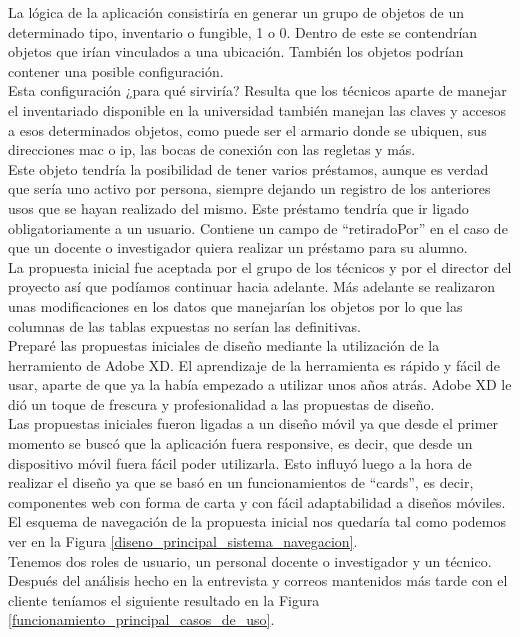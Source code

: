 La lógica de la aplicación consistiría en generar un grupo de objetos de un determinado tipo, inventario o fungible, 1 o 0. Dentro de este se contendrían objetos que irían vinculados a una ubicación. También los objetos podrían contener una posible configuración.
\\Esta configuración ¿para qué sirviría? Resulta que los técnicos aparte de manejar el inventariado disponible en la universidad también manejan las claves y accesos a esos determinados objetos, como puede ser el armario donde se ubiquen, sus direcciones mac o ip, las bocas de conexión con las regletas y más.
\\Este objeto tendría la posibilidad de tener varios préstamos, aunque es verdad que sería uno activo por persona, siempre dejando un registro de los anteriores usos que se hayan realizado del mismo. Este préstamo tendría que ir ligado obligatoriamente a un usuario. Contiene un campo de ``retiradoPor'' en el caso de que un docente o investigador quiera realizar un préstamo para su alumno.
\vspace{\baselineskip}
\\La propuesta inicial fue aceptada por el grupo de los técnicos y por el director del proyecto así que podíamos continuar hacia adelante. Más adelante se realizaron unas modificaciones en los datos que manejarían los objetos por lo que las columnas de las tablas expuestas no serían las definitivas.
\\Preparé las propuestas iniciales de diseño mediante la utilización de la herramiento de Adobe XD. El aprendizaje de la herramienta es rápido y fácil de usar, aparte de que ya la había empezado a utilizar unos años atrás. Adobe XD le dió un toque de frescura y profesionalidad a las propuestas de diseño.
\\Las propuestas iniciales fueron ligadas a un diseño móvil ya que desde el primer momento se buscó que la aplicación fuera responsive, es decir, que desde un dispositivo móvil fuera fácil poder utilizarla. Esto influyó luego a la hora de realizar el diseño ya que se basó en un funcionamientos de ``cards'', es decir, componentes web con forma de carta y con fácil adaptabilidad a diseños móviles.
\\El esquema de navegación de la propuesta inicial nos quedaría tal como podemos ver en la Figura \ref{diseno_principal_sistema_navegacion}.
\\Tenemos dos roles de usuario, un personal docente o investigador y un técnico. Después del análisis hecho en la entrevista y correos mantenidos más tarde con el cliente teníamos el siguiente resultado en la Figura \ref{funcionamiento_principal_casos_de_uso}.

